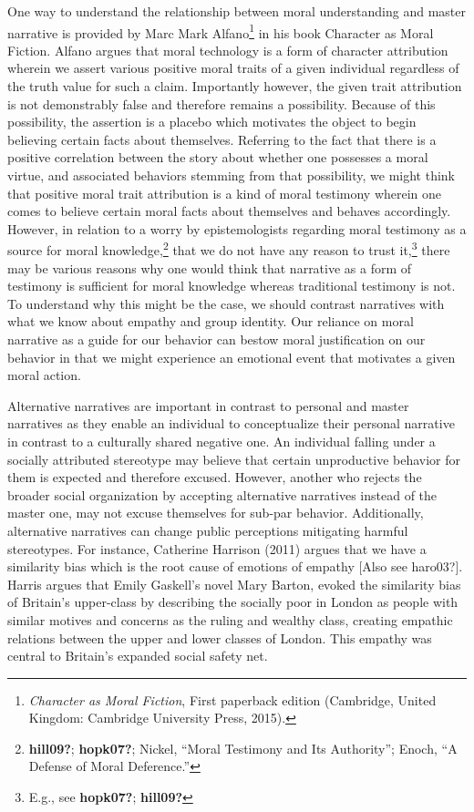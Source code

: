 \documentclass[phdthesis,12pt,final]{wuthesis}
\theoremstyle{definition}
\theoremstyle{definition}
\theoremstyle{definition}
\theoremstyle{definition}
\theoremstyle{remark}
\begin{document}
One way to understand the relationship between moral understanding and master narrative is provided by Marc Mark Alfano\footnote{\emph{Character as Moral Fiction}, First paperback edition (Cambridge, United Kingdom: Cambridge University Press, 2015).} in his book Character as Moral Fiction. Alfano argues that moral technology is a form of character attribution wherein we assert various positive moral traits of a given individual regardless of the truth value for such a claim. Importantly however, the given trait attribution is not demonstrably false and therefore remains a possibility. Because of this possibility, the assertion is a placebo which motivates the object to begin believing certain facts about themselves. Referring to the fact that there is a positive correlation between the story about whether one possesses a moral virtue, and associated behaviors stemming from that possibility, we might think that positive moral trait attribution is a kind of moral testimony wherein one comes to believe certain moral facts about themselves and behaves accordingly. However, in relation to a worry by epistemologists regarding moral testimony as a source for moral knowledge,\footnote{\textbf{hill09?}; \textbf{hopk07?}; Nickel, {``Moral {Testimony} and Its {Authority}''}; Enoch, {``A {Defense} of {Moral Deference}.''}} that we do not have any reason to trust it,\footnote{E.g., see \textbf{hopk07?}; \textbf{hill09?}} there may be various reasons why one would think that narrative as a form of testimony is sufficient for moral knowledge whereas traditional testimony is not. To understand why this might be the case, we should contrast narratives with what we know about empathy and group identity. Our reliance on moral narrative as a guide for our behavior can bestow moral justification on our behavior in that we might experience an emotional event that motivates a given moral action.

Alternative narratives are important in contrast to personal and master narratives as they enable an individual to conceptualize their personal narrative in contrast to a culturally shared negative one. An individual falling under a socially attributed stereotype may believe that certain unproductive behavior for them is expected and therefore excused. However, another who rejects the broader social organization by accepting alternative narratives instead of the master one, may not excuse themselves for sub-par behavior. Additionally, alternative narratives can change public perceptions mitigating harmful stereotypes. For instance, Catherine Harrison (2011) argues that we have a similarity bias which is the root cause of emotions of empathy {[}Also see haro03?{]}. Harris argues that Emily Gaskell's novel Mary Barton, evoked the similarity bias of Britain's upper-class by describing the socially poor in London as people with similar motives and concerns as the ruling and wealthy class, creating empathic relations between the upper and lower classes of London. This empathy was central to Britain's expanded social safety net.
\end{document}
